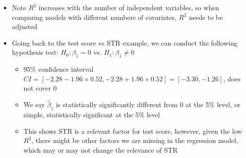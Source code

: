 \documentclass{article}
\begin{document}
\begin{itemize}
\begin{itemize}
    \end{itemize}
    \item Note $R^2$ increases with the number of independent variables, so when comparing models with different numbers of covariates, $R^2$ needs to be adjusted
    \item Going back to the test score vs STR example, we can conduct the following hypothesis test: $H_0: \beta_1 = 0$ vs. $H_1: \beta_1 \neq 0$
    \begin{itemize}
        \item 95\% confidence interval $CI=[-2.28-1.96 \times 0.52, -2.28 + 1.96 \times 0.52] = [-3.30,-1.26]$, does not cover 0
        \item We say $\hat{\beta}_1$ is statistically significantly different from 0 at the 5\% level, or simple, statistically significant at the 5\% level
        \item This shows STR is a relevant factor for test score, however, given the low $R^2$, there might be other factors we are missing in the regression model, which may or may not change the relevance of STR
    \end{itemize}
\end{itemize}
\end{document}
